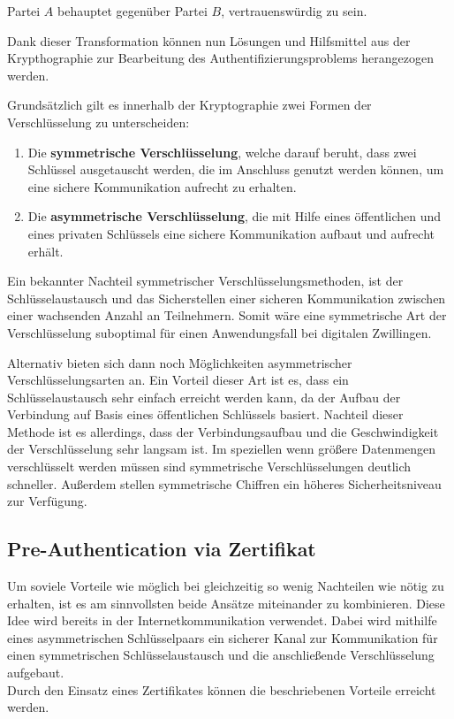 \begin{problem}[Authentifizierung]
    Partei $A$ behauptet gegenüber Partei $B$, vertrauenswürdig zu sein.
\end{problem}

Dank dieser Transformation können nun Lösungen und Hilfsmittel aus der Krypthographie zur Bearbeitung des Authentifizierungsproblems herangezogen werden.

Grundsätzlich gilt es innerhalb der Kryptographie zwei Formen der Verschlüsselung zu unterscheiden:

\begin{enumerate}
    \item Die \textbf{symmetrische Verschlüsselung}, welche darauf beruht, dass zwei Schlüssel ausgetauscht werden, die im Anschluss genutzt werden können, um eine sichere Kommunikation aufrecht zu erhalten.
    \item  Die \textbf{asymmetrische Verschlüsselung}, die mit Hilfe eines öffentlichen und eines privaten Schlüssels eine sichere Kommunikation aufbaut und aufrecht erhält.
\end{enumerate}

Ein bekannter Nachteil symmetrischer Verschlüsselungsmethoden, ist der Schlüsselaustausch und das Sicherstellen einer sicheren Kommunikation zwischen einer wachsenden Anzahl an Teilnehmern. Somit wäre eine symmetrische Art der Verschlüsselung suboptimal für einen Anwendungsfall bei digitalen Zwillingen. 

Alternativ bieten sich dann noch Möglichkeiten asymmetrischer Verschlüsselungsarten an. Ein Vorteil dieser Art ist es, dass ein Schlüsselaustausch sehr einfach erreicht werden kann, da der Aufbau der Verbindung auf Basis eines öffentlichen Schlüssels basiert. Nachteil dieser Methode ist es allerdings, dass der Verbindungsaufbau und die Geschwindigkeit der Verschlüsselung sehr langsam ist. Im speziellen wenn größere Datenmengen verschlüsselt werden müssen sind symmetrische Verschlüsselungen deutlich schneller. Außerdem stellen symmetrische Chiffren ein höheres Sicherheitsniveau zur Verfügung.

\subsection{Pre-Authentication via Zertifikat}
\label{sec:certificate}

Um soviele Vorteile wie möglich bei gleichzeitig so wenig Nachteilen wie nötig zu erhalten, ist es am sinnvollsten beide Ansätze miteinander zu kombinieren. Diese Idee wird bereits in der Internetkommunikation verwendet. Dabei wird mithilfe eines asymmetrischen Schlüsselpaars ein sicherer Kanal zur Kommunikation für einen symmetrischen Schlüsselaustausch und die anschließende Verschlüsselung aufgebaut. \\
Durch den Einsatz eines Zertifikates können die beschriebenen Vorteile erreicht werden.

